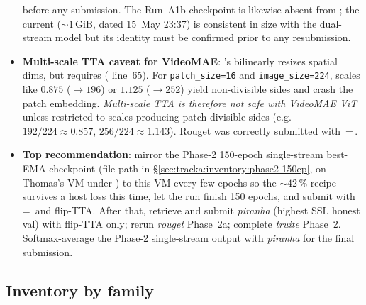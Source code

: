 \begin{itemize}[leftmargin=2em]
   before any submission.  The Run~A1b checkpoint
    is
   likewise absent from ; the current
    (\(\sim 1\,\)GiB, dated 15~May 23:37) is
   consistent in size with the dual-stream model but its identity must
   be confirmed prior to any resubmission.
\item \textbf{Multi-scale TTA caveat for VideoMAE}: 's
    bilinearly resizes spatial dims, but
    requires 
   ( line~65).  For \texttt{patch\_size=16} and
   \texttt{image\_size=224}, scales like \(0.875\) (\(\to 196\)) or
   \(1.125\) (\(\to 252\)) yield non-divisible sides and crash the patch
   embedding.  \emph{Multi-scale TTA is therefore not safe with VideoMAE
   ViT} unless restricted to scales producing patch-divisible sides
   (e.g.\ \(192/224 \approx 0.857\), \(256/224 \approx 1.143\)).  Rouget
   was correctly submitted with \,=\,\code{[1.0]}.
\item \textbf{Top recommendation}: mirror the Phase-2 150-epoch
   single-stream best-EMA checkpoint (file path in
   \S\ref{sec:tracka:inventory:phase2-150ep}, on Thomas's VM under
   ) to this VM
   every few epochs so the \(\sim 42\,\%\) recipe survives a host loss
   this time, let the run finish 150 epochs, and submit with
   \,=\,\code{[0.875,\,1.0,\,1.125]} and
   flip-TTA.  After that, retrieve and submit \emph{piranha} (highest
   SSL honest val) with flip-TTA only; rerun \emph{rouget} Phase~2a;
   complete \emph{truite} Phase~2.  Softmax-average the Phase-2
   single-stream output with \emph{piranha} for the final submission.
\end{itemize}

\subsection{Inventory by family}
\label{sec:tracka:inventory:table}

